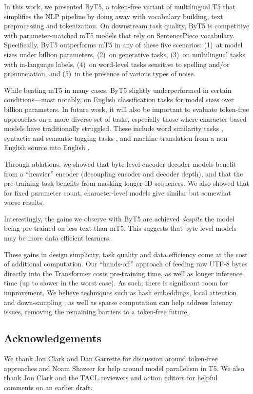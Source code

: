 \documentclass[11pt,a4paper]{article}
\begin{document}
In this work, we presented ByT5, a token-free variant of multilingual T5 \cite{mt5} that simplifies the NLP pipeline by doing away with vocabulary building, text preprocessing and tokenization. On downstream task quality, ByT5 is competitive with parameter-matched mT5 models that rely on SentencePiece vocabulary. Specifically, ByT5 outperforms mT5 in any of these five scenarios: (1)~at model sizes under  billion parameters, (2)~on generative tasks, (3)~on multilingual tasks with in-language labels, (4)~on word-level tasks sensitive to spelling and/or pronunciation, and (5)~in the presence of various types of noise.

While beating mT5 in many cases, ByT5 slightly underperformed in certain conditions---most notably, on English classification tasks for model sizes over  billion parameters. In future work, it will also be important to evaluate token-free approaches on a more diverse set of tasks, especially those where character-based models have traditionally struggled. These include word similarity tasks \cite{hiebert-etal-2018-interpreting}, syntactic and semantic tagging tasks \cite{durrani-etal-2019-one}, and machine translation from a non-English source into English \cite{shaham-levy-2021-neural}.

Through ablations, we showed that byte-level encoder-decoder models benefit from a ``heavier'' encoder (decoupling encoder and decoder depth), and that the pre-training task benefits from masking longer ID sequences. We also showed that for fixed parameter count, character-level models give similar but somewhat worse results.

Interestingly, the gains we observe with ByT5 are achieved \emph{despite} the model being pre-trained on  less text than mT5. This suggests that byte-level models may be more data efficient learners.

These gains in design simplicity, task quality and data efficiency come at the cost of additional computation. Our ``hands-off'' approach of feeding raw UTF-8 bytes directly into the Transformer costs  pre-training time, as well as longer inference time (up to  slower in the worst case). As such, there is significant room for improvement. We believe techniques such as hash embeddings, local attention and down-sampling \cite{clark2021canine}, as well as sparse computation \cite{fedus-2021-switch} can help address latency issues, removing the remaining barriers to a token-free future.

\subsection*{Acknowledgements}

We thank Jon Clark and Dan Garrette for discussion around token-free approaches and Noam Shazeer for help around model parallelism in T5. We also thank Jon Clark and the TACL reviewers and action editors for helpful comments on an earlier draft.



\end{document}
